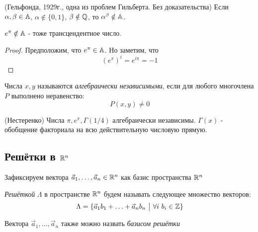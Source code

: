 \begin{theorem} (Гельфонда, 1929г., одна из проблем Гильберта. Без доказательства)
	Если $\alpha, \beta \in \mathbb{A}$, $\alpha \notin \{0, 1\}$, $\beta \notin \mathbb{Q}$, то $\alpha^\beta \notin \mathbb{A}$.
\end{theorem}

\begin{corollary}
	$e^\pi \notin \mathbb{A}$ - тоже трансцендентное число.
\end{corollary}

\begin{proof}
	Предположим, что $e^\pi \in \mathbb{A}$. Но заметим, что
	\[
		(e^\pi)^i = e^{i\pi} = -1
	\]
\end{proof}

\begin{definition}
	Числа $x, y$ называются \textit{алгебраически независимыми}, если для любого многочлена $P$ выполнено неравенство:
	\[
		P(x, y) \neq 0
	\]
\end{definition}

\begin{theorem} (Нестеренко)
	Числа $\pi, e^\pi, \Gamma(1/4)$ алгебраически независимы. $\Gamma(x)$ - обобщение факториала на всю действительную числовую прямую.
\end{theorem}

\subsection{Решётки в $\mathbb{R}^n$}

\begin{note}
	Зафиксируем вектора $\vec{a}_1, \ldots, \vec{a}_n \in \mathbb{R}^n$ как базис пространства $\mathbb{R}^n$
\end{note}

\begin{definition}
	\textit{Решёткой} $\Lambda$ в пространстве $\mathbb{R}^n$ будем называть следующее множество векторов:
	\[
		\Lambda = \{\vec{a}_1 b_1 + \ldots + \vec{a}_n b_n \ \big|\  \forall i\ b_i \in \mathbb{Z}\}
	\]
\end{definition}

\begin{definition}
	Вектора $\vec{a}_1, \ldots, \vec{a}_n$ также можно назвать \textit{базисом решётки}
\end{definition}

\begin{definition}
	
\end{definition}